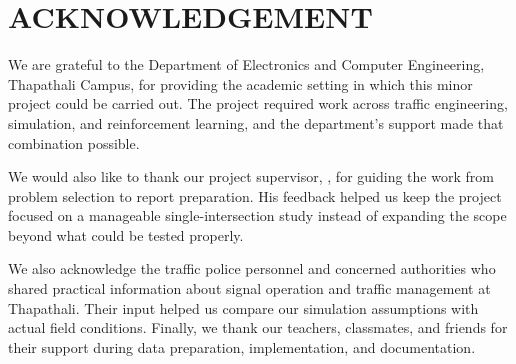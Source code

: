 
\chapter*{ACKNOWLEDGEMENT}
{}

We are grateful to the Department of Electronics and Computer Engineering, Thapathali Campus, for providing the academic setting in which this minor project could be carried out. The project required work across traffic engineering, simulation, and reinforcement learning, and the department's support made that combination possible.

We would also like to thank our project supervisor, \textbf{\cProjectCoordinator}, for guiding the work from problem selection to report preparation. His feedback helped us keep the project focused on a manageable single-intersection study instead of expanding the scope beyond what could be tested properly.

We also acknowledge the traffic police personnel and concerned authorities who shared practical information about signal operation and traffic management at Thapathali. Their input helped us compare our simulation assumptions with actual field conditions. Finally, we thank our teachers, classmates, and friends for their support during data preparation, implementation, and documentation.

\vspace{3em}
\noindent \authorTable
